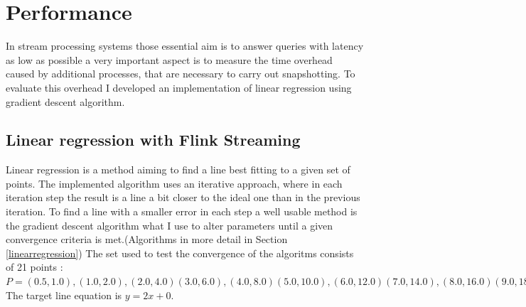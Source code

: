 \cite{abs}

\section{Performance}
In stream processing systems those essential aim is to answer queries with latency as low as possible a very important aspect is to measure the time overhead caused by  additional processes, that are necessary to carry out snapshotting. To evaluate this overhead I developed an implementation of linear regression using gradient descent
algorithm.
\subsection{Linear regression with Flink Streaming}
Linear regression is a method aiming to find a line best fitting to a given set of points. The implemented algorithm uses an iterative approach, where in each iteration step the result is a line a bit closer to the ideal one than in the previous iteration. To find a line with a smaller error in each step a well usable method is the gradient descent algorithm what I use to alter parameters until a given convergence criteria is met.(Algorithms in more detail in Section \ref{linearregression})
The set used to test the convergence of the algoritms consists of 21 points :
 		$P ={	(0.5, 1.0),( 1.0, 2.0 ),
			( 2.0, 4.0 )( 3.0, 6.0 ),
			( 4.0, 8.0 )(5.0, 10.0 ),
			( 6.0, 12.0 )( 7.0, 14.0 ),
			( 8.0, 16.0 )(9.0, 18.0 ),
			( 10.0, 20.0 )( -0.08, -0.16 ),
			( 0.13, 0.26 )( -1.17, -2.35 ),
			( 1.72, 3.45 )( 1.70, 3.41 ),
			( 1.20, 2.41 )( -0.59, -1.18 ),
			( 0.28, 0.57 )( 1.65, 3.30 ),
			( -0.55, -1.08 )}$
The target line equation is $y=2x+0$.

